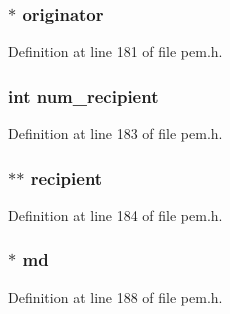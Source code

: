 \subsubsection[{\texorpdfstring{originator}{originator}}]{ $\ast$ originator}\hypertarget{structpem__ctx__st_a9c9cd5ab8c445cee10f586f88898a3f5}{}\label{structpem__ctx__st_a9c9cd5ab8c445cee10f586f88898a3f5}


Definition at line 181 of file pem.\+h.

\subsubsection[{\texorpdfstring{num\+\_\+recipient}{num_recipient}}]{\setlength{\rightskip}{0pt plus 5cm}int num\+\_\+recipient}\hypertarget{structpem__ctx__st_ab9b4271271265f723589e1ae9c95a37e}{}\label{structpem__ctx__st_ab9b4271271265f723589e1ae9c95a37e}


Definition at line 183 of file pem.\+h.

\subsubsection[{\texorpdfstring{recipient}{recipient}}]{ $\ast$$\ast$ recipient}\hypertarget{structpem__ctx__st_ab41991b907fd727401ab7f97bfbe7e10}{}\label{structpem__ctx__st_ab41991b907fd727401ab7f97bfbe7e10}


Definition at line 184 of file pem.\+h.

\subsubsection[{\texorpdfstring{md}{md}}]{ $\ast$ md}\hypertarget{structpem__ctx__st_a2afc0a58fe2c062b4e0272704d4b329b}{}\label{structpem__ctx__st_a2afc0a58fe2c062b4e0272704d4b329b}


Definition at line 188 of file pem.\+h.

